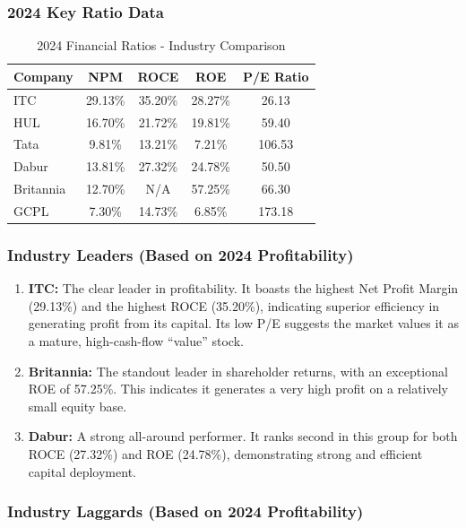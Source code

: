 \documentclass[12pt, a4paper]{report}
\begin{document}
\subsubsection*{2024 Key Ratio Data}

\begin{table}[H]
\centering
\begin{tabular}{lcccc}
\toprule
\textbf{Company} & \textbf{NPM} & \textbf{ROCE} & \textbf{ROE} & \textbf{P/E Ratio} \\
\midrule
ITC & 29.13\% & 35.20\% & 28.27\% & 26.13 \\
HUL & 16.70\% & 21.72\% & 19.81\% & 59.40 \\
Tata & 9.81\% & 13.21\% & 7.21\% & 106.53 \\
Dabur & 13.81\% & 27.32\% & 24.78\% & 50.50 \\
Britannia & 12.70\% & N/A & 57.25\% & 66.30 \\
GCPL & 7.30\% & 14.73\% & 6.85\% & 173.18 \\
\bottomrule
\end{tabular}
\caption{2024 Financial Ratios - Industry Comparison}
\end{table}

\subsubsection*{Industry Leaders (Based on 2024 Profitability)}

\begin{enumerate}
    \item \textbf{ITC:} The clear leader in profitability. It boasts the highest Net Profit Margin (29.13\%) and the highest ROCE (35.20\%), indicating superior efficiency in generating profit from its capital. Its low P/E suggests the market values it as a mature, high-cash-flow ``value'' stock.
    
    \item \textbf{Britannia:} The standout leader in shareholder returns, with an exceptional ROE of 57.25\%. This indicates it generates a very high profit on a relatively small equity base.
    
    \item \textbf{Dabur:} A strong all-around performer. It ranks second in this group for both ROCE (27.32\%) and ROE (24.78\%), demonstrating strong and efficient capital deployment.
\end{enumerate}

\subsubsection*{Industry Laggards (Based on 2024 Profitability)}
\end{document}
